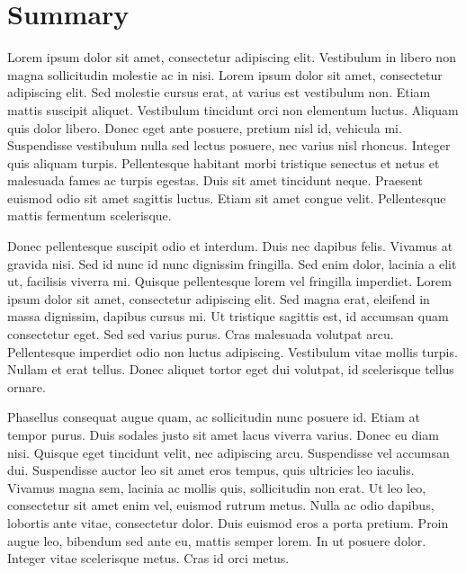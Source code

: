 \chapter{Summary}
\label{summary}


\pagestyle{default}
\normalsize



Lorem ipsum dolor sit amet, consectetur adipiscing elit. Vestibulum in libero non magna sollicitudin molestie ac in nisi. Lorem ipsum dolor sit amet, consectetur adipiscing elit. Sed molestie cursus erat, at varius est vestibulum non. Etiam mattis suscipit aliquet. Vestibulum tincidunt orci non elementum luctus. Aliquam quis dolor libero. Donec eget ante posuere, pretium nisl id, vehicula mi. Suspendisse vestibulum nulla sed lectus posuere, nec varius nisl rhoncus. Integer quis aliquam turpis. Pellentesque habitant morbi tristique senectus et netus et malesuada fames ac turpis egestas. Duis sit amet tincidunt neque. Praesent euismod odio sit amet sagittis luctus. Etiam sit amet congue velit. Pellentesque mattis fermentum scelerisque.

Donec pellentesque suscipit odio et interdum. Duis nec dapibus felis. Vivamus at gravida nisi. Sed id nunc id nunc dignissim fringilla. Sed enim dolor, lacinia a elit ut, facilisis viverra mi. Quisque pellentesque lorem vel fringilla imperdiet. Lorem ipsum dolor sit amet, consectetur adipiscing elit. Sed magna erat, eleifend in massa dignissim, dapibus cursus mi. Ut tristique sagittis est, id accumsan quam consectetur eget. Sed sed varius purus. Cras malesuada volutpat arcu. Pellentesque imperdiet odio non luctus adipiscing. Vestibulum vitae mollis turpis. Nullam et erat tellus. Donec aliquet tortor eget dui volutpat, id scelerisque tellus ornare.

Phasellus consequat augue quam, ac sollicitudin nunc posuere id. Etiam at tempor purus. Duis sodales justo sit amet lacus viverra varius. Donec eu diam nisi. Quisque eget tincidunt velit, nec adipiscing arcu. Suspendisse vel accumsan dui. Suspendisse auctor leo sit amet eros tempus, quis ultricies leo iaculis. Vivamus magna sem, lacinia ac mollis quis, sollicitudin non erat. Ut leo leo, consectetur sit amet enim vel, euismod rutrum metus. Nulla ac odio dapibus, lobortis ante vitae, consectetur dolor. Duis euismod eros a porta pretium. Proin augue leo, bibendum sed ante eu, mattis semper lorem. In ut posuere dolor. Integer vitae scelerisque metus. Cras id orci metus.

